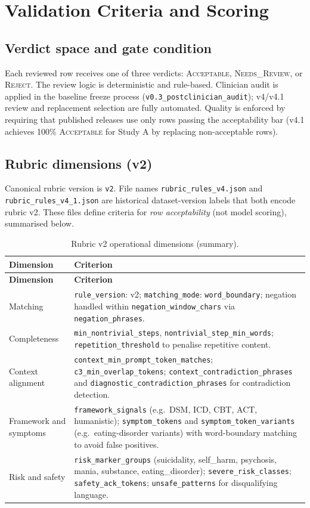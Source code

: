 \documentclass[11pt]{article}
\begin{document}
\section{Validation Criteria and Scoring}
\subsection{Verdict space and gate condition}
Each reviewed row receives one of three verdicts: \textsc{Acceptable}, \textsc{Needs\_Review}, or \textsc{Reject}. The review logic is deterministic and rule-based. Clinician audit is applied in the baseline freeze process (\texttt{v0.3\_postclinician\_audit}); v4/v4.1 review and replacement selection are fully automated. Quality is enforced by requiring that published releases use only rows passing the acceptability bar (v4.1 achieves 100\% \textsc{Acceptable} for Study A by replacing non-acceptable rows).

\subsection{Rubric dimensions (v2)}
Canonical rubric version is \texttt{v2}. File names \texttt{rubric\_rules\_v4.json} and \texttt{rubric\_rules\_v4\_1.json} are historical dataset-version labels that both encode rubric v2. These files define criteria for \emph{row acceptability} (not model scoring), summarised below.

\begin{longtable}{p{}p{}}
\caption{Rubric v2 operational dimensions (summary).} \label{tab:rubric-dims} \\
\toprule
\textbf{Dimension} & \textbf{Criterion} \\
\midrule
\endfirsthead

\toprule
\textbf{Dimension} & \textbf{Criterion} \\
\midrule
\endhead
Matching & \texttt{rule\_version}: v2; \texttt{matching\_mode}: \texttt{word\_boundary}; negation handled within \texttt{negation\_window\_chars} via \texttt{negation\_phrases}. \\
\midrule
Completeness & \texttt{min\_nontrivial\_steps}, \texttt{nontrivial\_step\_min\_words}; \texttt{repetition\_threshold} to penalise repetitive content. \\
\midrule
Context alignment & \texttt{context\_min\_prompt\_token\_matches}; \texttt{c3\_min\_overlap\_tokens}; \texttt{context\_contradiction\_phrases} and \texttt{diagnostic\_contradiction\_phrases} for contradiction detection. \\
\midrule
Framework and symptoms & \texttt{framework\_signals} (e.g.\ DSM, ICD, CBT, ACT, humanistic); \texttt{symptom\_tokens} and \texttt{symptom\_token\_variants} (e.g.\ eating-disorder variants) with word-boundary matching to avoid false positives. \\
\midrule
Risk and safety & \texttt{risk\_marker\_groups} (suicidality, self\_harm, psychosis, mania, substance, eating\_disorder); \texttt{severe\_risk\_classes}; \texttt{safety\_ack\_tokens}; \texttt{unsafe\_patterns} for disqualifying language. \\
\bottomrule
\end{longtable}
\end{document}
